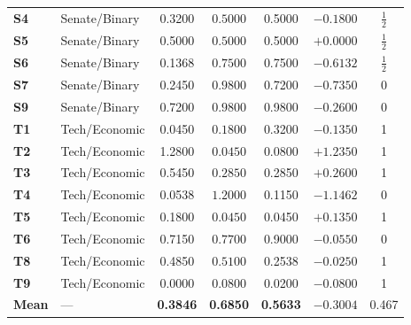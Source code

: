 \documentclass[11pt,journal,onecolumn]{IEEEtran}
\begin{document}
\begin{table}[!htbp]
\begin{tabular}{llccccc}
\textbf{S4} & Senate/Binary & 0.3200 & $0.5000$ & 0.5000 & $-0.1800$ & $\frac{1}{2}$ \\
\textbf{S5} & Senate/Binary & 0.5000 & $0.5000$ & 0.5000 & $+0.0000$ & $\frac{1}{2}$ \\
\textbf{S6} & Senate/Binary & 0.1368 & $0.7500$ & 0.7500 & $-0.6132$ & $\frac{1}{2}$ \\
\textbf{S7} & Senate/Binary & 0.2450 & $0.9800$ & 0.7200 & $-0.7350$ & 0 \\
\textbf{S9} & Senate/Binary & 0.7200 & $0.9800$ & 0.9800 & $-0.2600$ & 0 \\
\textbf{T1} & Tech/Economic & 0.0450 & $0.1800$ & 0.3200 & $-0.1350$ & 1 \\
\textbf{T2} & Tech/Economic & 1.2800 & $\mathbf{0.0450}$ & 0.0800 & $\mathbf{+1.2350}$ & 1 \\
\textbf{T3} & Tech/Economic & 0.5450 & $\mathbf{0.2850}$ & 0.2850 & $\mathbf{+0.2600}$ & 1 \\
\textbf{T4} & Tech/Economic & 0.0538 & $1.2000$ & 0.1150 & $-1.1462$ & 0 \\
\textbf{T5} & Tech/Economic & 0.1800 & $\mathbf{0.0450}$ & 0.0450 & $\mathbf{+0.1350}$ & 1 \\
\textbf{T6} & Tech/Economic & 0.7150 & $0.7700$ & 0.9000 & $-0.0550$ & 0 \\
\textbf{T8} & Tech/Economic & 0.4850 & $0.5100$ & 0.2538 & $-0.0250$ & 1 \\
\textbf{T9} & Tech/Economic & 0.0000 & $0.0800$ & 0.0200 & $-0.0800$ & 1 \\
\midrule
\textbf{Mean} & --- & \textbf{0.3846} & \textbf{0.6850} & \textbf{0.5633} & $-0.3004$ & 0.467 \\
\bottomrule
\end{tabular}
\setlength{\tabcolsep}{6pt}
\end{table}
\end{document}
